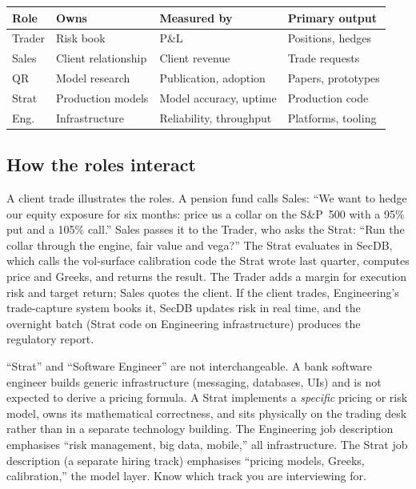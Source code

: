\begin{keyfactbox}
\begin{tabular}{llll}
\toprule
\textbf{Role} & \textbf{Owns} & \textbf{Measured by} & \textbf{Primary output} \\
\midrule
Trader   & Risk book       & P\&L            & Positions, hedges \\
Sales    & Client relationship & Client revenue & Trade requests \\
QR       & Model research   & Publication, adoption & Papers, prototypes \\
Strat    & Production models & Model accuracy, uptime & Production code \\
Eng.     & Infrastructure   & Reliability, throughput & Platforms, tooling \\
\bottomrule
\end{tabular}
\end{keyfactbox}

\subsection{How the roles interact}

A client trade illustrates the roles.  A pension fund calls Sales:
``We want to hedge our equity exposure for six months: price us
a collar on the S\&P~500 with a 95\% put and a 105\% call.''  Sales
passes it to the Trader, who asks the Strat: ``Run the collar
through the engine, fair value and vega?''  The Strat evaluates
in SecDB, which calls the vol-surface calibration code the Strat
wrote last quarter, computes price and Greeks, and returns the
result.  The Trader adds a margin for execution risk and target
return; Sales quotes the client.  If the client trades,
Engineering's trade-capture system books it, SecDB updates risk in
real time, and the overnight batch (Strat code on Engineering
infrastructure) produces the regulatory report.

\begin{pitfallbox}
``Strat'' and ``Software Engineer'' are not interchangeable.  A bank
software engineer builds generic infrastructure (messaging, databases,
UIs) and is not expected to derive a pricing formula.  A Strat
implements a \emph{specific} pricing or risk model, owns its
mathematical correctness, and sits physically on the trading desk
rather than in a separate technology building.  The Engineering job
description emphasises ``risk management, big data, mobile,'' all
infrastructure.  The Strat job description (a separate hiring track)
emphasises ``pricing models, Greeks, calibration,'' the model
layer.  Know which track you are interviewing for.
\end{pitfallbox}

